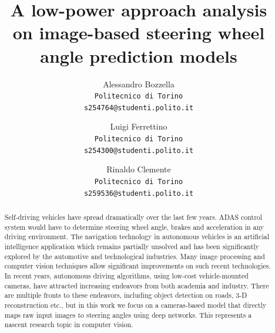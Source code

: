 \documentclass[10pt,twocolumn,letterpaper]{article}
\begin{document}
\title{A low-power approach analysis \\ on image-based steering wheel angle prediction models}

\author{
Alessandro Bozzella\\
\texttt{\small Politecnico di Torino}\\
{\tt\small s254764@studenti.polito.it}
\and
Luigi Ferrettino\\
\texttt{\small Politecnico di Torino}\\
{\tt\small s254300@studenti.polito.it}
\and
Rinaldo Clemente\\
\texttt{\small Politecnico di Torino}\\
{\tt\small s259536@studenti.polito.it}
}

\maketitle

\begin{abstract}
Self-driving vehicles have spread dramatically over the last few years. ADAS control system would have to determine steering wheel angle, brakes and acceleration in any driving environment. The navigation technology in autonomous vehicles is an artificial intelligence application which remains partially unsolved and has been significantly explored by the automotive and technological industries. Many image processing and computer vision techniques allow significant improvements on such recent technologies. In recent years, autonomous driving algorithms, using low-cost vehicle-mounted cameras, have attracted increasing endeavors from both academia and industry. There are multiple fronts to these endeavors, including object detection on roads, 3-D reconstruction etc., but in this work we focus on a cameras-based model that directly maps raw input images to steering angles using deep networks. This represents a nascent research topic in computer vision.
\end{abstract}

\end{document}
